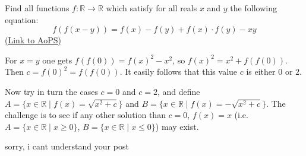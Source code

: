 \begin{problem}
	Find all functions $f: \mathbb R \to \mathbb R$ which satisfy for all reals $x$ and $y$ the following equation:
\[f(f(x-y)) =  f(x) - f(y) + f(x) \cdot f(y) -xy \]
	\flushright \href{https://artofproblemsolving.com/community/c6h388724}{(Link to AoPS)}
\end{problem}



\begin{solution}
	For $x=y$ one gets $f(f(0)) = f(x)^2 - x^2$, so $f(x)^2 = x^2 + f(f(0))$. Then $c = f(0)^2 = f(f(0))$. 
It easily follows that this value $c$ is either $0$ or $2$.

Now try in turn the cases $c = 0$ and $c =2$, and define $A = \{x \in \mathbb{R} \mid f(x) = \sqrt{x^2 + c}\}$ and $B = \{x \in \mathbb{R} \mid f(x) = -\sqrt{x^2 + c}\}$. The challenge is to see if any other solution than $c=0$, $f(x) = x$ (i.e. $A = \{x \in \mathbb{R} \mid x\geq 0 \}$, $B = \{x \in \mathbb{R} \mid x\leq 0 \}$) may exist.
\end{solution}



\begin{solution}
	sorry, i cant understand your post
\end{solution}



